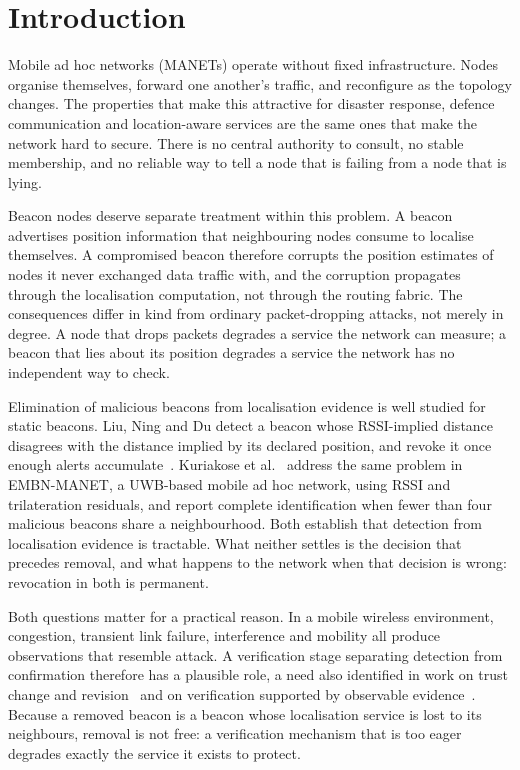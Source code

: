 \documentclass[pdflatex,sn-mathphys-num]{sn-jnl}%
\theoremstyle{thmstyleone}%
\theoremstyle{thmstyletwo}%
\theoremstyle{thmstylethree}%
\begin{document}
\section{Introduction}

Mobile ad hoc networks (MANETs) operate without fixed infrastructure. Nodes
organise themselves, forward one another's traffic, and reconfigure as the
topology changes. The properties that make this attractive for disaster
response, defence communication and location-aware services are the same
ones that make the network hard to secure. There is no central authority to
consult, no stable membership, and no reliable way to tell a node that is
failing from a node that is lying.

Beacon nodes deserve separate treatment within this problem. A beacon
advertises position information that neighbouring nodes consume to
localise themselves. A compromised beacon therefore corrupts the position
estimates of nodes it never exchanged data traffic with, and the corruption
propagates through the localisation computation, not through the
routing fabric. The consequences differ in kind from ordinary
packet-dropping attacks, not merely in degree. A node that drops packets
degrades a service the network can measure; a beacon that lies about its
position degrades a service the network has no independent way to check.

Elimination of malicious beacons from localisation evidence is well studied
for static beacons. Liu, Ning and Du detect a beacon whose RSSI-implied
distance disagrees with the distance implied by its declared position, and
revoke it once enough alerts accumulate~\cite{liu2005detecting}. Kuriakose
et al.~\cite{kuriakose2023embn} address the same problem in EMBN-MANET, a
UWB-based mobile ad hoc network, using RSSI and trilateration residuals, and
report complete identification when fewer than four malicious beacons share
a neighbourhood. Both establish that detection from localisation evidence is
tractable. What neither settles is the decision that precedes removal, and
what happens to the network when that decision is wrong: revocation in both
is permanent.

Both questions matter for a practical reason. In a mobile wireless
environment, congestion, transient link failure, interference and mobility
all produce observations that resemble attack. A verification stage
separating detection from confirmation therefore has a plausible role, a
need also identified in work on trust change and revision~\cite{chatzidakis2022trust}
and on verification supported by observable evidence~\cite{li2019dapv,ryu2023reputation}.
Because a removed beacon is a beacon whose localisation service is lost
to its neighbours, removal is not free: a verification mechanism that is too
eager degrades exactly the service it exists to protect.
\end{document}

